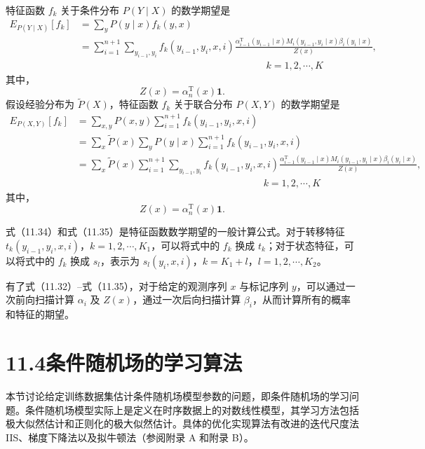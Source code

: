\documentclass[UTF8,12pt,a4paper,fontset=fandol]{ctexart}
\begin{document}
特征函数 $f_k$ 关于条件分布 $P(Y\mid X)$ 的数学期望是
\begin{equation}
\begin{aligned}
E_{P(Y\mid X)}[f_k]
&=\sum_y P(y\mid x)f_k(y,x)\\
&=\sum_{i=1}^{n+1}\sum_{y_{i-1},y_i}
f_k(y_{i-1},y_i,x,i)
\frac{\alpha_{i-1}^{\mathrm T}(y_{i-1}\mid x)M_i(y_{i-1},y_i\mid x)\beta_i(y_i\mid x)}{Z(x)},\\
&\hspace{8cm} k=1,2,\cdots,K
\end{aligned}
\tag{11.34}
\end{equation}
其中，
\[
Z(x)=\alpha_n^{\mathrm T}(x)\mathbf{1}.
\]
假设经验分布为 $\tilde P(X)$，特征函数 $f_k$ 关于联合分布 $P(X,Y)$ 的数学期望是
\begin{equation}
\begin{aligned}
E_{P(X,Y)}[f_k]
&=\sum_{x,y}P(x,y)\sum_{i=1}^{n+1}f_k(y_{i-1},y_i,x,i)\\
&=\sum_x\tilde P(x)\sum_yP(y\mid x)\sum_{i=1}^{n+1}f_k(y_{i-1},y_i,x,i)\\
&=\sum_x\tilde P(x)\sum_{i=1}^{n+1}\sum_{y_{i-1},y_i}
f_k(y_{i-1},y_i,x,i)
\frac{\alpha_{i-1}^{\mathrm T}(y_{i-1}\mid x)M_i(y_{i-1},y_i\mid x)\beta_i(y_i\mid x)}{Z(x)},\\
&\hspace{8cm} k=1,2,\cdots,K
\end{aligned}
\tag{11.35}
\end{equation}
其中，
\[
Z(x)=\alpha_n^{\mathrm T}(x)\mathbf{1}.
\]

式（11.34）和式（11.35）是特征函数数学期望的一般计算公式。对于转移特征 $t_k(y_{i-1},y_i,x,i)$，$k=1,2,\cdots,K_1$，可以将式中的 $f_k$ 换成 $t_k$；对于状态特征，可以将式中的 $f_k$ 换成 $s_l$，表示为 $s_l(y_i,x,i)$，$k=K_1+l$，$l=1,2,\cdots,K_2$。

有了式（11.32）--式（11.35），对于给定的观测序列 $x$ 与标记序列 $y$，可以通过一次前向扫描计算 $\alpha_i$ 及 $Z(x)$，通过一次后向扫描计算 $\beta_i$，从而计算所有的概率和特征的期望。

\section*{11.4\quad 条件随机场的学习算法}

本节讨论给定训练数据集估计条件随机场模型参数的问题，即条件随机场的学习问题。条件随机场模型实际上是定义在时序数据上的对数线性模型，其学习方法包括极大似然估计和正则化的极大似然估计。具体的优化实现算法有改进的迭代尺度法 IIS、梯度下降法以及拟牛顿法（参阅附录 A 和附录 B）。
\end{document}
